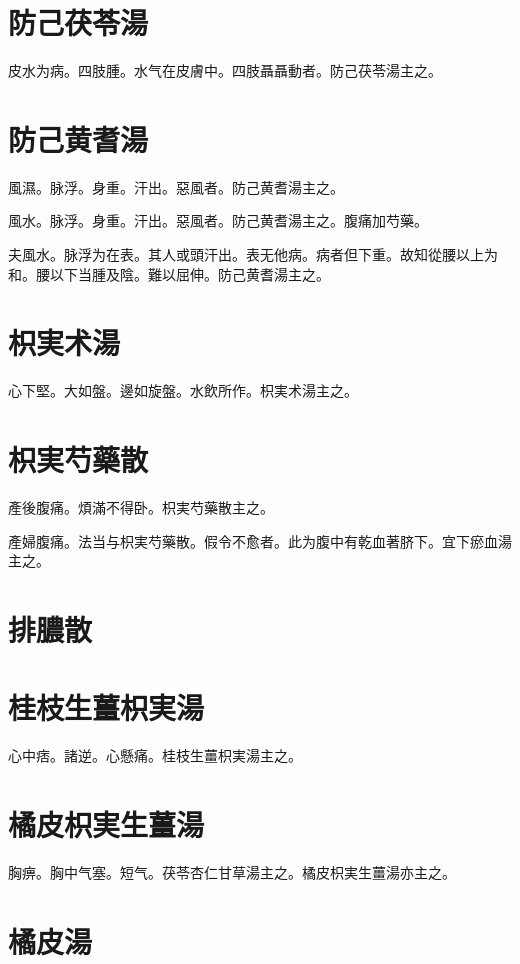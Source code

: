 \documentclass[12pt,twoside,UTF8,b5paper]{ctexbook}
\begin{document}
\section{防己茯苓湯}

皮水为病。四肢腫。水气在皮膚中。四肢聶聶動者。防己茯苓湯主之。

\section{防己黄耆湯}

風濕。脉浮。身重。汗出。惡風者。防己黄耆湯主之。

風水。脉浮。身重。汗出。惡風者。防己黄耆湯主之。腹痛加芍藥。

夫風水。脉浮为在表。其人或頭汗出。表无他病。病者但下重。故知從腰以上为和。腰以下当腫及陰。難以屈伸。防己黄耆湯主之。

\section{枳実术湯}

心下堅。大如盤。邊如旋盤。水飲所作。枳{実}术湯主之。

\section{枳実芍藥散}

產後腹痛。煩滿不得卧。枳実芍藥散主之。

產婦腹痛。法当与枳実芍藥散。假令不愈者。此为腹中有乾血著脐下。宜下瘀血湯主之。

\section{排膿散}

\section{桂枝生薑枳実湯}

心中痞。諸逆。心懸痛。桂枝生薑枳実湯主之。

\section{橘皮枳実生薑湯}

胸痹。胸中气塞。短气。茯苓杏仁甘草湯主之。橘{皮}枳{実生}薑湯亦主之。

\section{橘皮湯}
\end{document}

